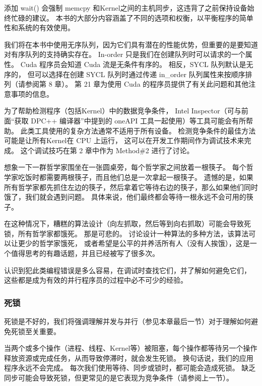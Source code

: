 添加 wait() 会强制 memcpy 和Kernel之间的主机同步，这违背了之前保持设备始终忙碌的建议。 
本书的大部分内容涵盖了不同的选项和权衡，以平衡程序的简单性和系统的有效使用。

\begin{remark}
	我们将在本书中使用无序队列，因为它们具有潜在的性能优势，但重要的是要知道对有序队列的支持确实存在。 
	In-order 只是我们在创建队列时可以请求的一个属性。 Cuda 程序员会知道 Cuda 流是无条件有序的。 
	相反，SYCL 队列默认是无序的，
	但可以选择在创建 SYCL 队列时通过传递 in\_order 队列属性来按顺序排列（请参阅第 8 章）。 
	第 21 章为使用 Cuda 的程序员提供了有关此问题和其他注意事项的信息。
\end{remark}

为了帮助检测程序（包括Kernel）中的数据竞争条件，
Intel Inspector（可与前面“获取 DPC++ 编译器”中提到的 oneAPI 工具一起使用）等工具可能会有所帮助。 
此类工具使用的复杂方法通常不适用于所有设备。 检测竞争条件的最佳方法可能是让所有Kernel在 CPU 上运行，
这可以在开发工作期间作为调试技术来完成。 这个调试技巧在第 2 章中作为 Method\#2 进行了讨论。

\begin{remark}
想象一下一群哲学家围坐在一张圆桌旁，每个哲学家之间放着一根筷子。 
每个哲学家吃饭时都需要两根筷子，而且他们总是一次拿起一根筷子。 
遗憾的是，如果所有哲学家都先抓住左边的筷子，然后拿着它等待右边的筷子，那么如果他们同时饿了，我们就会遇到问题。 
具体来说，他们最终都会等待一根永远不会可用的筷子。

在这种情况下，糟糕的算法设计（向左抓取，然后等到向右抓取）可能会导致死锁，所有哲学家都饿死。 
那是可悲的。 讨论设计一种算法的多种方法，该算法可以让更少的哲学家饿死，
或者希望是公平的并养活所有人（没有人挨饿），这是一个值得思考的有趣话题，并且已经被写了很多次。

认识到犯此类编程错误是多么容易，在调试时查找它们，并了解如何避免它们，
这些都是成为有效的并行程序员的过程中必不可少的经验。
\end{remark}

\subsubsection{死锁}
死锁是不好的，我们将强调理解并发与并行（参见本章最后一节）对于理解如何避免死锁至关重要。

当两个或多个操作（进程、线程、Kernel等）被阻塞，每个操作都等待另一个操作释放资源或完成任务，从而导致停滞时，就会发生死锁。 
换句话说，我们的应用程序永远不会完成。 每次我们使用等待、同步或锁时，都可能会造成死锁。 
缺乏同步可能会导致死锁，但更常见的是它表现为竞争条件（请参阅上一节）。

